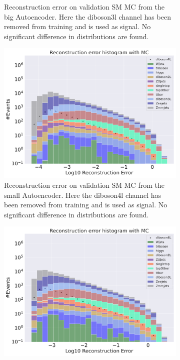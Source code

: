 \begin{figure}[H]
\begin{subfigure}{.45\textwidth}
        \caption{Reconstruction error on validation SM MC from the big Autoencoder. Here the diboson3l channel has been removed from training and 
        is used as signal. No significant difference in distributions are found. }
        \label{fig:ae_big_diboson3l}
    \end{subfigure}
    \hfill
    \begin{subfigure}{.45\textwidth}
        \includegraphics[width=\textwidth]{Figures/AE_testing/small/b_data_recon_big_rm3_feats_sig_diboson4l.pdf}
        \caption{Reconstruction error on validation SM MC from the small Autoencoder. Here the diboson4l channel has been removed from training and 
        is used as signal. No significant difference in distributions are found. }
        \label{fig:ae_small_diboson4l}
    \end{subfigure}
    \hfill 
    \begin{subfigure}{.45\textwidth}
        \includegraphics[width=\textwidth]{Figures/AE_testing/big/b_data_recon_big_rm3_feats_sig_diboson4l.pdf}

\end{subfigure}
\end{figure}
